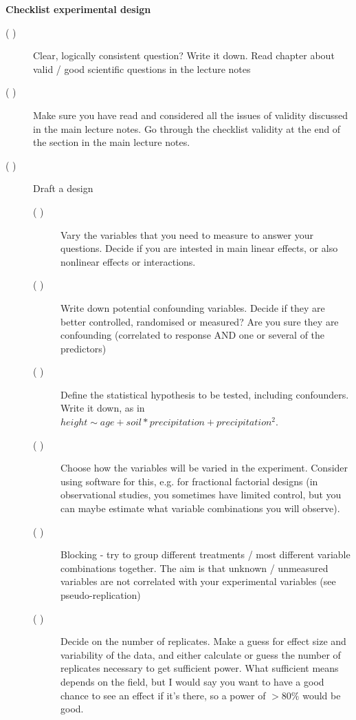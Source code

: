 \documentclass[a4paper,twoside]{tufte-book}\usepackage[]{graphicx}\usepackage[]{color}
\begin{document}
\newpage
\begin{mdframed}
    
\textbf{Checklist experimental design}

\begin{description}

\item[( )] Clear, logically consistent question? Write it down. Read chapter about valid / good scientific questions in the lecture notes

\item[( )] Make sure you have read and considered all the issues of validity discussed in the main lecture notes. Go through the checklist validity at the end of the section in the main lecture notes.

\item[( )] Draft a design

  \begin{description}

  \item[( )] Vary the variables that you need to measure to answer your questions. Decide if you are intested in main linear effects, or also nonlinear effects or interactions. 
  
  \item[( )] Write down potential confounding variables. Decide if they are better controlled, randomised or measured? Are you sure they are confounding (correlated to response AND one or several of the predictors)
  
  \item[( )] Define the statistical hypothesis to be tested, including confounders. Write it down, as in $height  \sim age + soil * precipitation + precipitation^2$. 
  
  \item[( )] Choose how the variables will be varied in the experiment. Consider using software for this, e.g. for fractional factorial designs (in observational studies, you sometimes have limited control, but you can maybe estimate what variable combinations you will observe).
  
  \item[( )] Blocking - try to group different treatments / most different variable combinations together. The aim is that unknown / unmeasured variables are not correlated with your experimental variables (see pseudo-replication)
  
  \item[( )] Decide on the number of replicates. Make a guess for effect size and variability of the data, and either calculate or guess the number of replicates necessary to get sufficient power. What sufficient means depends on the field, but I would say you want to have a good chance to see an effect if it's there, so a power of $>80\%$ would be good. 
  

\end{description}
\end{description}
\end{mdframed}
\end{document}
